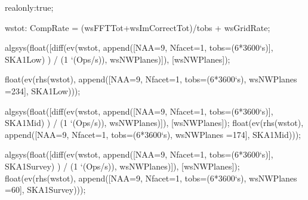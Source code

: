 \documentclass[useAMS,usenatbib,referee]{article}
\begin{document}
\begin{maxima}[]

realonly:true;

wstot: CompRate = (wsFFTTot+wsImCorrectTot)/tobs + wsGridRate;

algsys(float([diff(ev(wstot, append([NAA=9, Nfacet=1, tobs=(6*3600`s)], SKA1Low) ) / (1 `(Ops/s)), wsNWPlanes)]), [wsNWPlanes]);

float(ev(rhs(wstot), append([NAA=9, Nfacet=1, tobs=(6*3600`s), wsNWPlanes =234], SKA1Low)));

algsys(float([diff(ev(wstot, append([NAA=9, Nfacet=1, tobs=(6*3600`s)], SKA1Mid) ) / (1 `(Ops/s)), wsNWPlanes)]), [wsNWPlanes]);
float(ev(rhs(wstot), append([NAA=9, Nfacet=1, tobs=(6*3600`s), wsNWPlanes =174], SKA1Mid)));

algsys(float([diff(ev(wstot, append([NAA=9, Nfacet=1, tobs=(6*3600`s)], SKA1Survey) ) / (1 `(Ops/s)), wsNWPlanes)]), [wsNWPlanes]);
float(ev(rhs(wstot), append([NAA=9, Nfacet=1, tobs=(6*3600`s), wsNWPlanes =60], SKA1Survey)));




\end{maxima}
\end{document}
